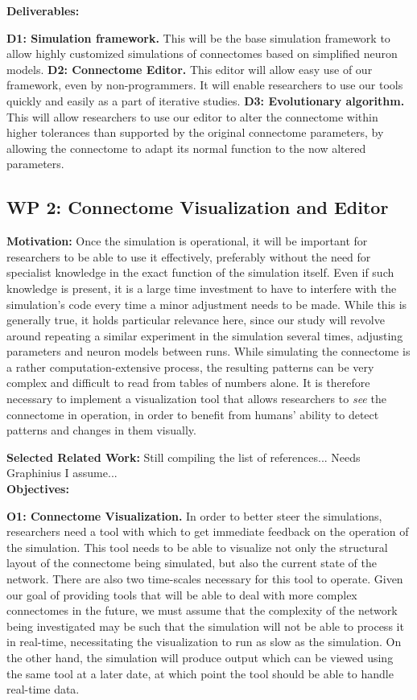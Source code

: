 \documentclass[a4paper,11pt]{article}
\begin{document}
\textbf{Deliverables:}

\textbf{D1: Simulation framework.} This will be the base simulation framework to allow highly customized simulations of connectomes based on simplified neuron models.
\textbf{D2: Connectome Editor.} This editor will allow easy use of our framework, even by non-programmers. It will enable researchers to use our tools quickly and easily as a part of iterative studies.
\textbf{D3: Evolutionary algorithm.} This will allow researchers to use our editor to alter the connectome within higher tolerances than supported by the original connectome parameters, by allowing the connectome to adapt its normal function to the now altered parameters.

\subsection{WP 2: Connectome Visualization and Editor}

\textbf{Motivation:}
Once the simulation is operational, it will be important for researchers to be able to use it effectively, preferably without the need for specialist knowledge in the exact function of the simulation itself. Even if such knowledge is present, it is a large time investment to have to interfere with the simulation's code every time a minor adjustment needs to be made. While this is generally true, it holds particular relevance here, since our study will revolve around repeating a similar experiment in the simulation several times, adjusting parameters and neuron models between runs.
While simulating the connectome is a rather computation-extensive process, the resulting patterns can be very complex and difficult to read from tables of numbers alone. It is therefore necessary to implement a visualization tool that allows researchers to \emph{see} the connectome in operation, in order to benefit from humans' ability to detect patterns and changes in them visually.

\textbf{Selected Related Work:}
Still compiling the list of references... Needs Graphinius I assume...
\\[0,2cm]

\textbf{Objectives:}

\textbf{O1: Connectome Visualization.}
In order to better steer the simulations, researchers need a tool with which to get immediate feedback on the operation of the simulation. This tool needs to be able to visualize not only the structural layout of the connectome being simulated, but also the current state of the network.
There are also two time-scales necessary for this tool to operate. Given our goal of providing tools that will be able to deal with more complex connectomes in the future, we must assume that the complexity of the network being investigated may be such that the simulation will not be able to process it in real-time, necessitating the visualization to run as slow as the simulation. On the other hand, the simulation will produce output which can be viewed using the same tool at a later date, at which point the tool should be able to handle real-time data.
\end{document}
